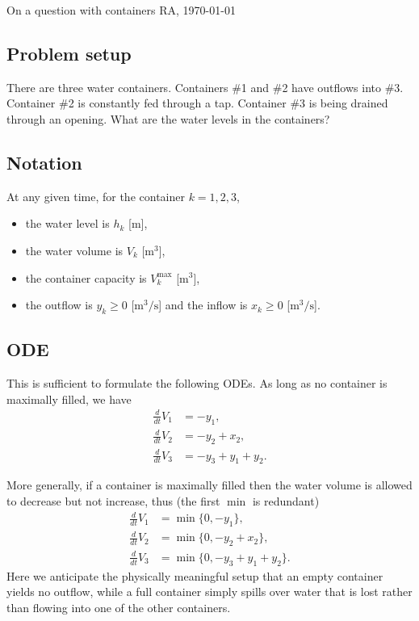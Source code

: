 \documentclass[12pt,a4paper]{article}
\begin{document}
    
    On a question with containers
    \hfill
    RA, \today
    
	\subsection*{Problem setup}
    
	There are three water containers.
	Containers \#1 and \#2 have outflows into \#3.
	Container \#2 is constantly fed through a tap.
	Container \#3 is being drained through an opening.
	What are the water levels in the containers?
	
	\subsection*{Notation}
	
	At any given time, for the container $k = 1, 2, 3$,
	\begin{itemize}
	\item 
		the water level is $h_k$ [$\text{m}$],
	\item
		the water volume is $V_k$ [$\text{m}^3$],
	\item
		the container capacity is $V_k^\text{max}$ [$\text{m}^3$],
	\item
		the outflow is $y_k \geq 0$ [$\mathrm{m^3/s}$]
		and
		the inflow is $x_k \geq 0$ [$\mathrm{m^3/s}$].
	\end{itemize}
	
	\subsection*{ODE}
	
	This is sufficient to formulate the following ODEs.
	As long as no container is maximally filled, we have
	\begin{subequations}
		\begin{align}
			\tfrac{d}{dt} V_1 & = -y_1 , \\
			\tfrac{d}{dt} V_2 & = -y_2 + x_2 , \\
			\tfrac{d}{dt} V_3 & = -y_3 + y_1 + y_2 .
		\end{align}
	\end{subequations}
	
	More generally,
	if a container is maximally filled
	then
	the water volume is allowed to decrease but not increase,
	thus
	(the first $\min$ is redundant)
	\begin{subequations}
		\begin{align}
			\tfrac{d}{dt} V_1 & = \min\{ 0, -y_1 \} , \\
			\tfrac{d}{dt} V_2 & = \min\{ 0, -y_2 + x_2 \} , \\
			\tfrac{d}{dt} V_3 & = \min\{ 0, -y_3 + y_1 + y_2 \} .
		\end{align}
	\end{subequations}
	Here
	we anticipate the physically meaningful setup
	that
	an empty container yields no outflow,
	while
	a full container simply spills over water that is lost
	rather than flowing into one of the other containers.
	
\end{document}
